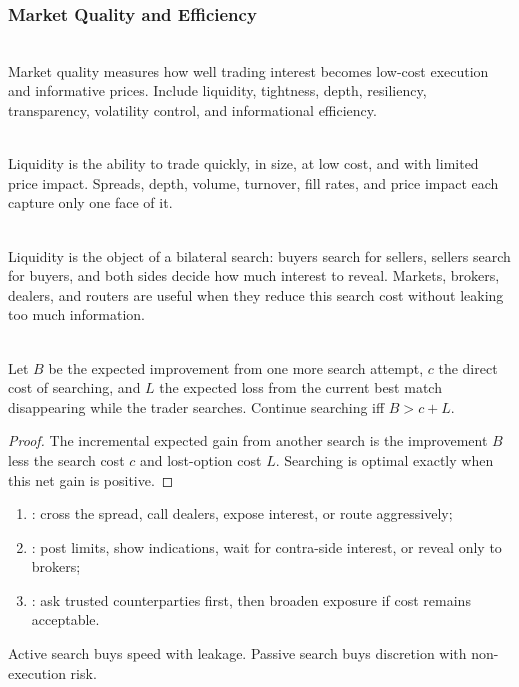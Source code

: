 \subsubsection{Market Quality and Efficiency}

\begin{definition} \\
Market quality measures how well trading interest becomes low-cost execution and informative prices. Include liquidity, tightness, depth, resiliency, transparency, volatility control, and informational efficiency.
\end{definition}

\begin{definition} \\
Liquidity is the ability to trade quickly, in size, at low cost, and with limited price impact. Spreads, depth, volume, turnover, fill rates, and price impact each capture only one face of it.
\end{definition}

\begin{mechanism} \\
Liquidity is the object of a bilateral search: buyers search for sellers, sellers search for buyers, and both sides decide how much interest to reveal. Markets, brokers, dealers, and routers are useful when they reduce this search cost without leaking too much information.
\end{mechanism}

\begin{proposition} \\
Let $B$ be the expected improvement from one more search attempt, $c$ the direct cost of searching, and $L$ the expected loss from the current best match disappearing while the trader searches. Continue searching iff $B>c+L$.
\begin{proof}
The incremental expected gain from another search is the improvement $B$ less the search cost $c$ and lost-option cost $L$. Searching is optimal exactly when this net gain is positive.
\end{proof}
\end{proposition}

\begin{taxonomy} 
\begin{enumerate}[label=\roman*.]
\setlength{\itemsep}{0pt}
\item {}: cross the spread, call dealers, expose interest, or route aggressively;
\item {}: post limits, show indications, wait for contra-side interest, or reveal only to brokers;
\item {}: ask trusted counterparties first, then broaden exposure if cost remains acceptable.
\end{enumerate}
Active search buys speed with leakage. Passive search buys discretion with non-execution risk.
\end{taxonomy}

